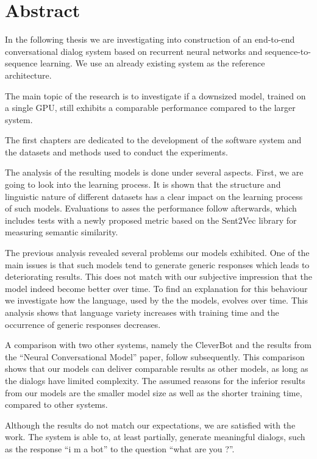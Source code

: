 \chapter*{Abstract}
In the following thesis we are investigating into construction of an end-to-end conversational dialog system based on recurrent neural networks and sequence-to-sequence learning. We use an already existing system as the reference architecture. 

The main topic of the research is to investigate if a downsized model, trained on a single GPU, still exhibits a comparable performance compared to the larger system. 

The first chapters are dedicated to the development of the software system and the datasets and methods used to conduct the experiments.

The analysis of the resulting models is done under several aspects. First, we are going to look into the learning process. It is shown that the structure and linguistic nature of different datasets has a clear impact on the learning process of such models. Evaluations to asses the performance follow afterwards, which includes tests with a newly proposed metric based on the Sent2Vec library for measuring semantic similarity.

The previous analysis revealed several problems our models exhibited. One of the main issues is that such models tend to generate generic responses which leads to deteriorating results. This does not match with our subjective impression that the model indeed become better over time. To find an explanation for this behaviour we investigate how the language, used by the the models, evolves over time. This analysis shows that language variety increases with training time and the occurrence of generic responses decreases.

A comparison with two other systems, namely the CleverBot and the results from the ``Neural Conversational Model'' paper, follow subsequently. This comparison shows that our models can deliver comparable results as other models, as long as the dialogs have limited complexity. The assumed reasons for the inferior results from our models are the smaller model size as well as the shorter training time, compared to other systems.

Although the results do not match our expectations, we are satisfied with the work. The system is able to, at least partially, generate meaningful dialogs, such as the response ``i m a bot'' to the question ``what are you ?''.

